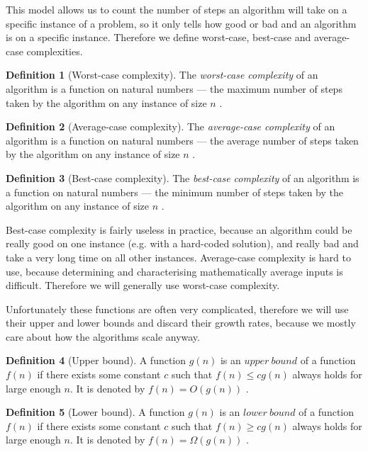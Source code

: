 \documentclass{report}
\theoremstyle{plain}
\theoremstyle{definition}
\newtheorem{definition}{Definition}
\theoremstyle{remark}
\numberwithin{definition}{chapter}
\numberwithin{example}{chapter}
\numberwithin{figure}{chapter}
\numberwithin{theorem}{chapter}
\numberwithin{lemma}{chapter}
\begin{document}
This model allows us to count the number of steps an algorithm will take on a specific instance of a problem, so it only tells how good or bad and an algorithm is on a specific instance. Therefore we define worst-case, best-case and average-case complexities.

\begin{definition}[Worst-case complexity]
The \emph{worst-case complexity} of an algorithm is a function on natural numbers --- the maximum number of steps taken by the algorithm on any instance of size $n$ \cite{skiena504algorithm}.
\end{definition}

\begin{definition}[Average-case complexity]
The \emph{average-case complexity} of an algorithm is a function on natural numbers --- the average number of steps taken by the algorithm on any instance of size $n$ \cite{skiena504algorithm}.
\end{definition}

\begin{definition}[Best-case complexity]
The \emph{best-case complexity} of an algorithm is a function on natural numbers --- the minimum number of steps taken by the algorithm on any instance of size $n$ \cite{skiena504algorithm}.
\end{definition}

Best-case complexity is fairly useless in practice, because an algorithm could be really good on one instance (e.g. with a hard-coded solution), and really bad and take a very long time on all other instances. Average-case complexity is hard to use, because determining and characterising mathematically average inputs is difficult. Therefore we will generally use worst-case complexity.

Unfortunately these functions are often very complicated, therefore we will use their upper and lower bounds and discard their growth rates, because we mostly care about how the algorithms scale anyway.

\begin{definition}[Upper bound]
A function $g(n)$ is an $upper \ bound$ of a function $f(n)$ if there exists some constant $c$ such that $f(n)\leq cg(n)$ always holds for large enough $n$. It is denoted by $f(n) = O(g(n))$ \cite{skiena504algorithm}.
\end{definition}

\begin{definition}[Lower bound]
A function $g(n)$ is an $lower \ bound$ of a function $f(n)$ if there exists some constant $c$ such that $f(n)\geq cg(n)$ always holds for large enough $n$. It is denoted by $f(n) = \Omega(g(n))$ \cite{skiena504algorithm}.
\end{definition}
\end{document}
